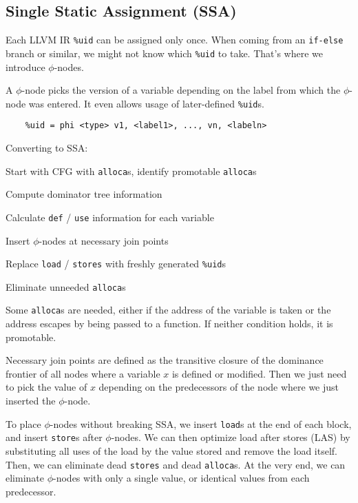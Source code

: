 \subsection*{Single Static Assignment (SSA)}

Each LLVM IR \texttt{\%uid} can be assigned only once. When coming from an \texttt{if-else} branch or similar, we might not know which \texttt{\%uid} to take. That's where we introduce $\phi$-nodes.\medskip

A $\phi$-node picks the version of a variable depending on the label from which the $\phi$-node was entered. It even allows usage of later-defined \texttt{\%uid}s.\medskip

\begin{lstlisting}
	%uid = phi <type> v1, <label1>, ..., vn, <labeln>
\end{lstlisting}\medskip

Converting to SSA:
\begin{compactitem}
	\item Start with CFG with \texttt{alloca}s, identify promotable \texttt{alloca}s
	\item Compute dominator tree information
	\item Calculate \texttt{def} / \texttt{use} information for each variable
	\item Insert $\phi$-nodes at necessary join points
	\item Replace \texttt{load} / \texttt{stores} with freshly generated \texttt{\%uid}s
	\item Eliminate unneeded \texttt{alloca}s
\end{compactitem}\medskip


\columnbreak


Some \texttt{alloca}s are needed, either if the address of the variable is taken or the address escapes by being passed to a function. If neither condition holds, it is promotable.\medskip

Necessary join points are defined as the transitive closure of the dominance frontier of all nodes where a variable $x$ is defined or modified. Then we just need to pick the value of $x$ depending on the predecessors of the node where we just inserted the $\phi$-node.\medskip

To place $\phi$-nodes without breaking SSA, we insert \texttt{load}s at the end of each block, and insert \texttt{store}s after $\phi$-nodes. We can then optimize load after stores (LAS) by substituting all uses of the load by the value stored and remove the load itself. Then, we can eliminate dead \texttt{stores} and dead \texttt{alloca}s. At the very end, we can eliminate $\phi$-nodes with only a single value, or identical values from each predecessor.
